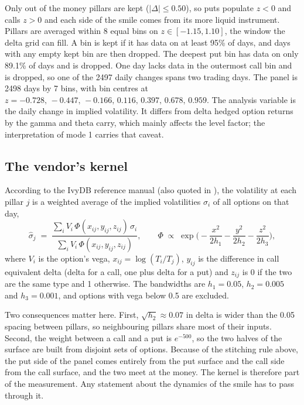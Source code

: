 \documentclass[11pt]{article}
\begin{document}
Only out of the money pillars are kept ($|\Delta|\le0.50$), so puts populate $z<0$ and calls $z>0$ and each side of the smile comes from its more liquid instrument. Pillars are averaged within 8 equal bins on $z\in[-1.15,1.10]$, the window the delta grid can fill. A bin is kept if it has data on at least 95\% of days, and days with any empty kept bin are then dropped. The deepest put bin has data on only 89.1\% of days and is dropped. One day lacks data in the outermost call bin and is dropped, so one of the 2497 daily changes spans two trading days. The panel is 2498 days by 7 bins, with bin centres at $z=-0.728,\,-0.447,\,-0.166,\,0.116,\,0.397,\,0.678,\,0.959$. The analysis variable is the daily change in implied volatility. It differs from delta hedged option returns by the gamma and theta carry, which mainly affects the level factor; the interpretation of mode 1 carries that caveat.

\subsection{The vendor's kernel}

According to the IvyDB reference manual \cite{ivydb} (also quoted in \cite{avellaneda}), the volatility at each pillar $j$ is a weighted average of the implied volatilities $\sigma_i$ of all options on that day,
\begin{equation}
\hat\sigma_j \;=\; \frac{\sum_i V_i\,\Phi(x_{ij},y_{ij},z_{ij})\,\sigma_i}{\sum_i V_i\,\Phi(x_{ij},y_{ij},z_{ij})},\qquad
\Phi \;\propto\; \exp\!\Big(-\frac{x^2}{2h_1}-\frac{y^2}{2h_2}-\frac{z^2}{2h_3}\Big),
\end{equation}
where $V_i$ is the option's vega, $x_{ij}=\log(T_i/T_j)$, $y_{ij}$ is the difference in call equivalent delta (delta for a call, one plus delta for a put) and $z_{ij}$ is 0 if the two are the same type and 1 otherwise. The bandwidths are $h_1=0.05$, $h_2=0.005$ and $h_3=0.001$, and options with vega below 0.5 are excluded.

Two consequences matter here. First, $\sqrt{h_2}\approx0.07$ in delta is wider than the 0.05 spacing between pillars, so neighbouring pillars share most of their inputs. Second, the weight between a call and a put is $e^{-500}$, so the two halves of the surface are built from disjoint sets of options. Because of the stitching rule above, the put side of the panel comes entirely from the put surface and the call side from the call surface, and the two meet at the money. The kernel is therefore part of the measurement. Any statement about the dynamics of the smile has to pass through it.
\end{document}
